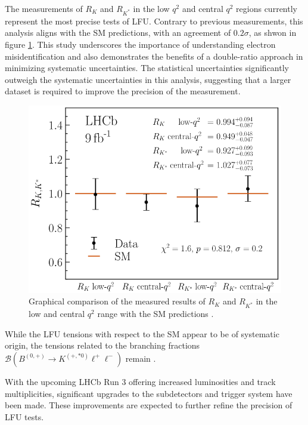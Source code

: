 The measurements of $R_K$ and $R_{K^*}$ in the low $q^2$ 
and central $q^2$ regions currently represent the most 
precise tests of LFU. 
Contrary to previous measurements, this analysis aligns 
with the SM predictions, with an agreement of 
$\num{0.2}\sigma$, as shwon in figure \ref{fig:results}. 
This study underscores the importance of understanding 
electron misidentification and also demonstrates the 
benefits of a double-ratio approach in minimizing 
systematic uncertainties. The statistical uncertainties 
significantly outweigh the systematic uncertainties in this 
analysis, suggesting that a larger dataset is required 
to improve the precision of the measurement.

\begin{figure}
    \centering
    \includegraphics[width=\linewidth]{figures/results.png}
    \caption{Graphical comparison of the measured results of $R_K$ and $R_{K^*}$ in the low and central $q^2$ range with the SM predictions \cite{lhcbcollaboration2022measurement}.}
    \label{fig:results}
\end{figure}

While the LFU tensions with respect to the SM 
appear to be of systematic origin, the tensions related to 
the branching fractions $\mathcal{B}(B^{(0,+)}\to K^{(+,*0)}\ell^+\ell^-)$ 
remain \cite{Branchingfraction}.

With the upcoming LHCb Run 3 offering increased luminosities 
and track multiplicities, significant upgrades to the subdetectors 
and trigger system have been made. These improvements are expected 
to further refine the precision of LFU tests.